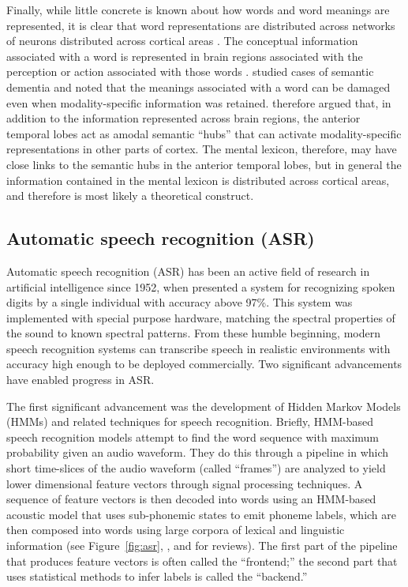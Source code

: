 Finally,
while little concrete is known
about how words and word meanings
are represented,
it is clear that word representations
are distributed across networks
of neurons distributed
across cortical areas
\citep{pulvermuller2001}.
The conceptual information associated
with a word is represented
in brain regions associated with
the perception or action associated
with those words
\citep{martin2007}.
\citet{patterson2007} studied
cases of semantic dementia
and noted that the meanings
associated with a word can be damaged
even when modality-specific
information was retained.
\citeauthor{patterson2007} therefore
argued that,
in addition to the information
represented across brain regions,
the anterior temporal lobes
act as amodal semantic ``hubs''
that can activate modality-specific
representations in other parts of cortex.
The mental lexicon, therefore,
may have close links to
the semantic hubs in
the anterior temporal lobes,
but in general
the information contained in the mental lexicon
is distributed across cortical areas,
and therefore
is most likely a theoretical construct.

\subsection{Automatic speech recognition (ASR)}

Automatic speech recognition (ASR) has been
an active field of research
in artificial intelligence since 1952,
when \citet{davis1952}
presented a system for recognizing
spoken digits by a single individual
with accuracy above 97\%.
This system was implemented
with special purpose hardware,
matching the spectral properties of
the sound to known spectral patterns.
From these humble beginning,
modern speech recognition systems
can transcribe speech
in realistic environments
with accuracy high enough
to be deployed commercially.
Two significant advancements
have enabled progress in ASR.

The first significant advancement
was the development of
Hidden Markov Models (HMMs)
and related techniques
for speech recognition.
Briefly,
HMM-based speech recognition models
attempt to find the word sequence
with maximum probability given
an audio waveform.
They do this through
a pipeline in which
short time-slices of the audio waveform
(called ``frames'')
are analyzed to yield lower dimensional
feature vectors
through signal processing techniques.
A sequence of feature vectors
is then decoded into words
using an HMM-based acoustic model
that uses sub-phonemic states
to emit phoneme labels,
which are then composed into words
using large corpora of
lexical and linguistic information
(see Figure~\ref{fig:asr},
\citet{bahl1983}, and
\cite{rabiner1989,gales2008} for reviews).
The first part of the pipeline
that produces feature vectors
is often called the ``frontend;''
the second part that uses
statistical methods to infer labels
is called the ``backend.''

